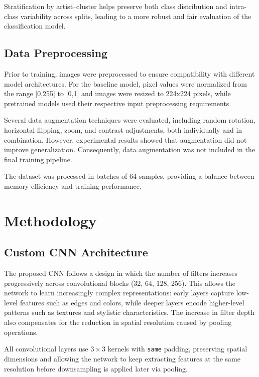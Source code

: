 \documentclass[12pt,a4paper]{article}
\begin{document}
Stratification by artist–cluster helps preserve both class distribution and intra-class variability across splits, leading to a more robust and fair evaluation of the classification model.

\subsection{Data Preprocessing}

Prior to training, images were preprocessed to ensure compatibility with different model architectures. 
For the baseline model, pixel values were normalized from the range [0,255] to [0,1] and images were resized to 224x224 pixels, while pretrained models used their respective input preprocessing requirements. 

Several data augmentation techniques were evaluated, including random rotation, horizontal flipping, zoom, and contrast adjustments, both individually and in combination. 
However, experimental results showed that augmentation did not improve generalization. 
Consequently, data augmentation was not included in the final training pipeline.

The dataset was processed in batches of 64 samples, providing a balance between memory efficiency and training performance.

\section{Methodology}

\subsection{Custom CNN Architecture}

The proposed CNN follows a design in which the number of filters increases progressively across convolutional blocks (32, 64, 128, 256). 
This allows the network to learn increasingly complex representations: early layers capture low-level features such as edges and colors, while deeper layers encode higher-level patterns such as textures and stylistic characteristics.
The increase in filter depth also compensates for the reduction in spatial resolution caused by pooling operations.

All convolutional layers use $3 \times 3$ kernels with \texttt{same} padding, preserving spatial dimensions and allowing the network to keep extracting features at the same resolution before downsampling is applied later via pooling.
\end{document}

